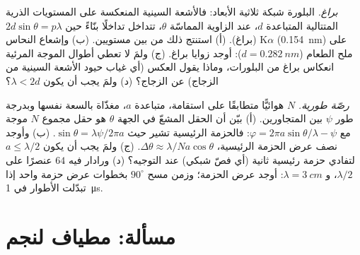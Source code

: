 \begin{exercise}[$\star\star\star$]\label{exo:b2:gratings:11}
\emph{براغ.} البلورة شبكة ثلاثية الأبعاد: فالأشعة السينية
المنعكسة على المستويات الذرية المتتالية المتباعدة $d$، عند
الزاوية المماسّة $\theta$، تتداخل تداخلًا بنّاءً حين $2d\sin\theta = p\lambda$
(براغ). (أ) استنتج ذلك من  بين مستويين.
(ب) وإشعاع النحاس K$\alpha$ (\qty{0.154}{nm}) على ملح الطعام ($d = \qty{0.282}{nm}$):
أوجد زوايا براغ. (ج) ولمَ لا تعطي أطوال الموجة المرئية انعكاس براغ
من البلورات، وماذا يقول العكس (أي غياب حيود الأشعة
السينية من الزجاج) عن الزجاج؟ (د) ولمَ يجب أن يكون $\lambda < 2d$؟
\end{exercise}

\begin{exercise}[$\star\star\star$]\label{exo:b2:gratings:12}
\emph{رصّة طورية.} $N$ هوائيًّا متطابقًا على استقامة، متباعدة $a$، مغذّاة
بالسعة نفسها وبدرجة طور $\psi$ بين المتجاورين. (أ)
بيّن أن الحقل المشعّ في الجهة $\theta$ هو حقل مجموع
$N$ موجة مع $\varphi = 2\pi a\sin\theta/\lambda - \psi$: فالحزمة الرئيسية تشير
حيث $\sin\theta = \lambda\psi/2\pi a$. (ب) وأوجد نصف عرض الحزمة الرئيسية، $\Delta\theta
\approx \lambda/Na\cos\theta$. (ج) ولمَ يجب أن يكون $a \le \lambda/2$ لتفادي حزمة رئيسية ثانية
(أي فصّ شبكي) عند التوجيه؟ (د) ورادار فيه $64$ عنصرًا على
$\lambda/2$، و $\lambda = \qty{3}{cm}$: أوجد عرض الحزمة؛ وزمن مسح $90^\circ$ بخطوات عرض
حزمة واحد إذا تبدّلت الأطوار في \qty{1}{\micro s}.
\end{exercise}

\section{مسألة: مطياف لنجم}


